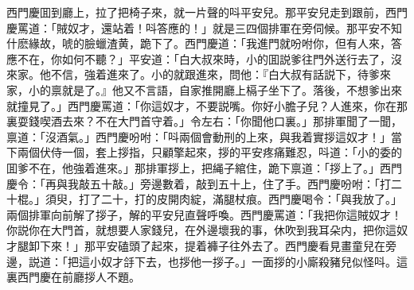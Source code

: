 西門慶囬到廳上，拉了把椅子來，就一片聲的呌平安兒。那平安兒走到跟前，西門慶罵道：「賊奴才，還站着！呌答應的！」就是三四個排軍在旁伺候。那平安不知什麽緣故，唬的臉蠟渣黄，跪下了。西門慶道：「我進門就吩咐你，但有人來，答應不在，你如何不聽？」平安道：「白大叔來時，小的囬説爹往門外送行去了，沒來家。他不信，強着進來了。小的就跟進來，問他：『白大叔有話説下，待爹來家，小的禀就是了。』他又不言語，自家推開廳上槅子坐下了。落後，不想爹出來就撞見了。」西門慶罵道：「你這奴才，不要説嘴。你好小膽子兒？人進來，你在那裏耍錢喫酒去來？不在大門首守着。」令左右：「你聞他口裏。」那排軍聞了一聞，禀道：「沒酒氣。」西門慶吩咐：「呌兩個會動刑的上來，與我着實拶這奴才！」當下兩個伏侍一個，套上拶指，只顧擎起來，拶的平安疼痛難忍，呌道：「小的委的囬爹不在，他強着進來。」那排軍拶上，把䋲子綰住，跪下禀道：「拶上了。」西門慶令：「再與我敲五十敲。」旁邊數着，敲到五十上，住了手。西門慶吩咐：「打二十棍。」須臾，打了二十，打的皮開肉綻，滿腿杖痕。西門慶喝令：「與我放了。」兩個排軍向前解了拶子，解的平安兒直聲呼喚。西門慶罵道：「我把你這賊奴才！你説你在大門首，就想要人家錢兒，在外邊壞我的事，休吹到我耳朵内，把你這奴才腿卸下來！」那平安磕頭了起來，提着褲子往外去了。西門慶看見畫童兒在旁邊，説道：「把這小奴才㧱下去，也拶他一拶子。」一面拶的小廝殺豬兒似怪呌。這裏西門慶在前廳拶人不題。


